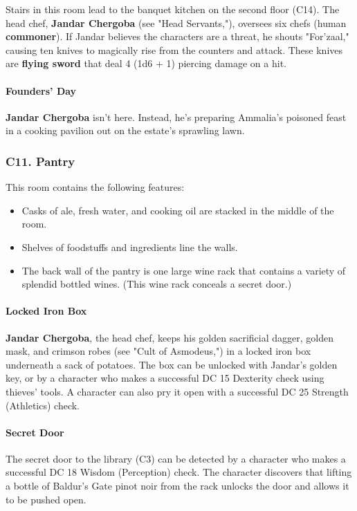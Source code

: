 \documentclass[10pt,a4paper,twoside,twocolumn,openany,nodeprecatedcode]{dndbook}
\begin{document}
Stairs in this room lead to the banquet kitchen on the second floor (C14).
The head chef, \textbf{Jandar Chergoba} (see "Head Servants,"), oversees six chefs (human \textbf{commoner}). If Jandar believes the characters are a threat, he shouts "For'zaal," causing ten knives to magically rise from the counters and attack. These knives are \textbf{flying sword} that deal 4 (1d6 + 1) piercing damage on a hit.
\paragraph{Founders' Day}
\textbf{Jandar Chergoba} isn't here. Instead, he's preparing Ammalia's poisoned feast in a cooking pavilion out on the estate's sprawling lawn.
\subsubsection{C11. Pantry}
This room contains the following features:
\begin{itemize}

\item Casks of ale, fresh water, and cooking oil are stacked in the middle of the room.
\item Shelves of foodstuffs and ingredients line the walls.
\item The back wall of the pantry is one large wine rack that contains a variety of splendid bottled wines. (This wine rack conceals a secret door.)
\end{itemize}


\paragraph{Locked Iron Box}
\textbf{Jandar Chergoba}, the head chef, keeps his golden sacrificial dagger, golden mask, and crimson robes (see "Cult of Asmodeus,") in a locked iron box underneath a sack of potatoes. The box can be unlocked with Jandar's golden key, or by a character who makes a successful DC 15 Dexterity check using thieves' tools. A character can also pry it open with a successful DC 25 Strength (Athletics) check.
\paragraph{Secret Door}
The secret door to the library (C3) can be detected by a character who makes a successful DC 18 Wisdom (Perception) check. The character discovers that lifting a bottle of Baldur's Gate pinot noir from the rack unlocks the door and allows it to be pushed open.
\end{document}
